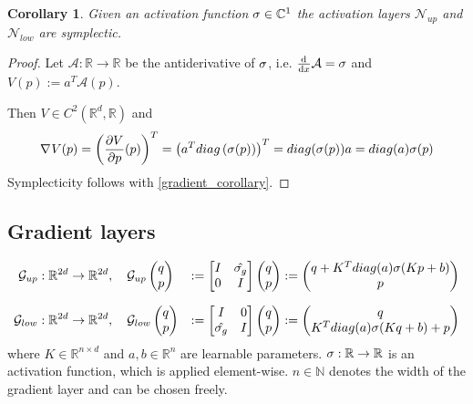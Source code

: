 \documentclass[twoside,a4paper]{article}
\newtheorem{corollary}{Corollary}
\begin{document}
\begin{corollary}
	Given an activation function $\sigma \in \mathbb{C}^1$
	the activation layers $\mathcal{N}_{up}$ and $\mathcal{N}_{low}$ are symplectic.
\end{corollary}
\begin{proof}
	Let $\mathcal{A}: \mathbb{R} \to \mathbb{R}$ be the antiderivative of $\sigma$, 
	i.e. $\frac{\mathrm{d}^{}}{\mathrm{d}x} \mathcal{A} = \sigma$ and $V(p) := a^T\mathcal{A}(p)$.

	Then $V \in C^2(\mathbb{R}^d, \mathbb{R})$ and
	\begin{equation*}
		\nabla_{}{V}(p) = \left(\frac{\partial V}{\partial p}(p)\right)^T = \left( a^Tdiag\left(\sigma(p)\right)\right)^T
		= diag(\sigma(p)) a
		= diag(a) \sigma(p)
	\end{equation*}
	Symplecticity follows with \cref{gradient_corollary}.
\end{proof}

\subsection{Gradient layers}

\begin{alignat*}{2}
	\mathcal{G}_{up} &: \mathbb{R}^{2d} \to \mathbb{R}^{2d}, \quad
	\mathcal{G}_{up} \begin{pmatrix} q \\ p \end{pmatrix} &:= \begin{bmatrix} I & {\hat{\sigma_g}} \\ 0 & I \end{bmatrix} \begin{pmatrix} q \\ p \end{pmatrix} := \begin{pmatrix}
		q + K^T diag(a) \sigma(Kp + b) \\
		p
	\end{pmatrix} \\[7pt]
	\mathcal{G}_{low} &: \mathbb{R}^{2d} \to \mathbb{R}^{2d}, \quad
	\mathcal{G}_{low} \begin{pmatrix} q \\ p \end{pmatrix} &:= \begin{bmatrix} I & 0 \\ {\hat{\sigma_g}} & I \end{bmatrix} \begin{pmatrix} q \\ p \end{pmatrix} := \begin{pmatrix}
		q \\
		K^T diag(a) \sigma(Kq + b) + p
	\end{pmatrix}
\end{alignat*}
where $K \in \mathbb{R}^{n \times d}$ and $a,b \in \mathbb{R}^n$
are learnable parameters. $\sigma : \mathbb{R} \to \mathbb{R}$ 
is an activation function, which is applied element-wise.
$n \in \mathbb{N}$ denotes the width of the gradient layer and can be chosen freely.
\end{document}
